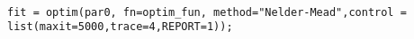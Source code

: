 \documentclass[12pt, oneside]{article}   	%
\begin{document}
\begin{lstlisting}

fit = optim(par0, fn=optim_fun, method="Nelder-Mead",control = list(maxit=5000,trace=4,REPORT=1));

\end{lstlisting}


\clearpage

\clearpage
 

\end{document}
